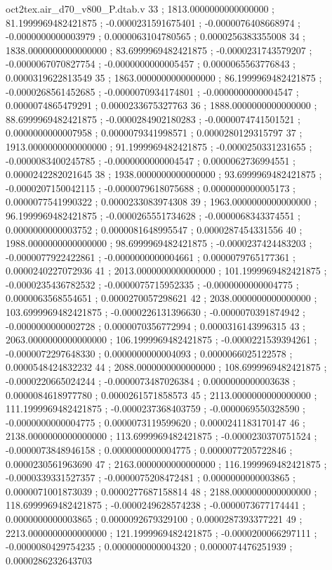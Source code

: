 \begin{filecontents}[overwrite]{oct2tex.air_d70_v800_P.dtab.v}
33 ; 1813.0000000000000000 ; 81.1999969482421875 ; -0.0000231591675401 ; -0.0000076408668974 ; -0.0000000000003979 ; 0.0000063104780565 ; 0.0000256383355008
34 ; 1838.0000000000000000 ; 83.6999969482421875 ; -0.0000231743579207 ; -0.0000067070827754 ; -0.0000000000005457 ; 0.0000065563776843 ; 0.0000319622813549
35 ; 1863.0000000000000000 ; 86.1999969482421875 ; -0.0000268561452685 ; -0.0000070934174801 ; -0.0000000000004547 ; 0.0000074865479291 ; 0.0000233675327763
36 ; 1888.0000000000000000 ; 88.6999969482421875 ; -0.0000284902180283 ; -0.0000074741501521 ; 0.0000000000007958 ; 0.0000079341998571 ; 0.0000280129315797
37 ; 1913.0000000000000000 ; 91.1999969482421875 ; -0.0000250331231655 ; -0.0000083400245785 ; -0.0000000000004547 ; 0.0000062736994551 ; 0.0000242282021645
38 ; 1938.0000000000000000 ; 93.6999969482421875 ; -0.0000207150042115 ; -0.0000079618075688 ; 0.0000000000005173 ; 0.0000077541990322 ; 0.0000233083974308
39 ; 1963.0000000000000000 ; 96.1999969482421875 ; -0.0000265551734628 ; -0.0000068343374551 ; 0.0000000000003752 ; 0.0000081648995547 ; 0.0000287454331556
40 ; 1988.0000000000000000 ; 98.6999969482421875 ; -0.0000237424483203 ; -0.0000077922422861 ; -0.0000000000004661 ; 0.0000079765177361 ; 0.0000240227072936
41 ; 2013.0000000000000000 ; 101.1999969482421875 ; -0.0000235436782532 ; -0.0000075715952335 ; -0.0000000000004775 ; 0.0000063568554651 ; 0.0000270057298621
42 ; 2038.0000000000000000 ; 103.6999969482421875 ; -0.0000226131396630 ; -0.0000070391874942 ; -0.0000000000002728 ; 0.0000070356772994 ; 0.0000316143996315
43 ; 2063.0000000000000000 ; 106.1999969482421875 ; -0.0000221539394261 ; -0.0000072297648330 ; 0.0000000000004093 ; 0.0000066025122578 ; 0.0000548424832232
44 ; 2088.0000000000000000 ; 108.6999969482421875 ; -0.0000220665024244 ; -0.0000073487026384 ; 0.0000000000003638 ; 0.0000084618977780 ; 0.0000261571858573
45 ; 2113.0000000000000000 ; 111.1999969482421875 ; -0.0000237368403759 ; -0.0000069550328590 ; -0.0000000000004775 ; 0.0000073119599620 ; 0.0000241183170147
46 ; 2138.0000000000000000 ; 113.6999969482421875 ; -0.0000230370751524 ; -0.0000073848946158 ; 0.0000000000004775 ; 0.0000077205722846 ; 0.0000230561963690
47 ; 2163.0000000000000000 ; 116.1999969482421875 ; -0.0000339331527357 ; -0.0000075208472481 ; 0.0000000000003865 ; 0.0000071001873039 ; 0.0000277687158814
48 ; 2188.0000000000000000 ; 118.6999969482421875 ; -0.0000249628574238 ; -0.0000073677174441 ; 0.0000000000003865 ; 0.0000092679329100 ; 0.0000287393377221
49 ; 2213.0000000000000000 ; 121.1999969482421875 ; -0.0000200066297111 ; -0.0000080429754235 ; 0.0000000000004320 ; 0.0000074476251939 ; 0.0000286232643703

\end{filecontents}
